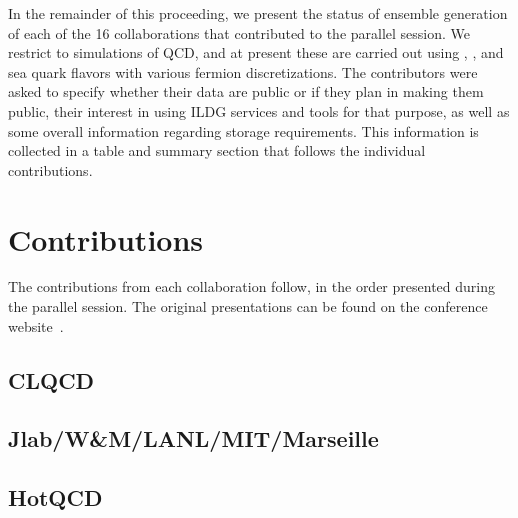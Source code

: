 \documentclass[a4paper,11pt]{article}
\begin{document}
In the remainder of this proceeding, we present the status of ensemble
generation of each of the 16 collaborations that contributed to the
parallel session. We restrict to simulations of QCD, and at present
these are carried out using , , and
 sea quark flavors with various fermion
discretizations. The contributors were asked to specify whether their
data are public or if they plan in making them public, their interest
in using ILDG services and tools for that purpose, as well as some
overall information regarding storage requirements. This information
is collected in a table and summary section that follows the
individual contributions.

\section{Contributions}
The contributions from each collaboration follow, in the order
presented during the parallel session. The original presentations can
be found on the conference website~\cite{parallel-session}.

\newpage
\subsection{CLQCD}

\subsection{Jlab/W\&M/LANL/MIT/Marseille}
\newpage
\subsection{HotQCD}
\end{document}
